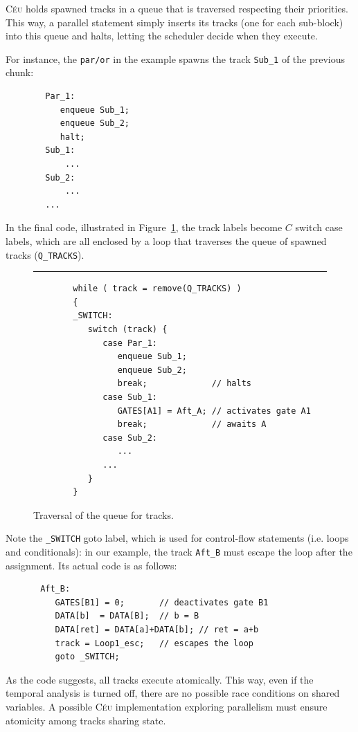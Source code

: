 \documentclass[11pt,a4paper]{article}
\newcommand{\2}{\;\;}
\newcommand{\5}{\;\;\;\;\;}
\newcommand{\CEU}{\textsc{C\'{e}u}}
\newcommand{\code}[1] {{\small{\texttt{#1}}}}
\begin{document}
\CEU{} holds spawned tracks in a queue that is traversed respecting their 
priorities.
This way, a parallel statement simply inserts its tracks (one for each 
sub-block) into this queue and halts, letting the scheduler decide when they 
execute.

\newpage
For instance, the \code{par/or} in the example spawns the track \code{Sub\_1} 
of the previous chunk:
{\small
\begin{verbatim}
        Par_1:
           enqueue Sub_1;
           enqueue Sub_2;
           halt;
        Sub_1:
            ...
        Sub_2:
            ...
        ...
\end{verbatim}
}
In the final code, illustrated in Figure~\ref{lst:impl:code:2}, the track 
labels become $C$ switch case labels, which are all enclosed by a loop that 
traverses the queue of spawned tracks (\code{Q\_TRACKS}).

\begin{figure}[h]
\rule{15cm}{0.37pt}
{\small
\begin{verbatim}
        while ( track = remove(Q_TRACKS) )
        {
        _SWITCH:
           switch (track) {
              case Par_1:
                 enqueue Sub_1;
                 enqueue Sub_2;
                 break;             // halts
              case Sub_1:
                 GATES[A1] = Aft_A; // activates gate A1
                 break;             // awaits A
              case Sub_2:
                 ...
              ...
           }
        }
\end{verbatim}
}
\caption{ Traversal of the queue for tracks.
\label{lst:impl:code:2}
}
\end{figure}

Note the \code{\_SWITCH} goto label, which is used for control-flow statements 
(i.e. loops and conditionals): in our example, the track \code{Aft\_B} must escape 
the loop after the assignment.
Its actual code is as follows:
{\small
\begin{verbatim}
       Aft_B:
          GATES[B1] = 0;       // deactivates gate B1
          DATA[b]  = DATA[B];  // b = B
          DATA[ret] = DATA[a]+DATA[b]; // ret = a+b
          track = Loop1_esc;   // escapes the loop
          goto _SWITCH;
\end{verbatim}
}

As the code suggests, all tracks execute atomically.
This way, even if the temporal analysis is turned off, there are no possible 
race conditions on shared variables.
A possible \CEU{} implementation exploring parallelism must ensure atomicity 
among tracks sharing state.
\end{document}
